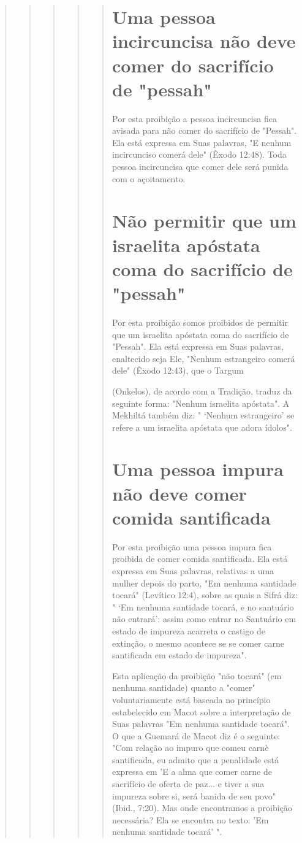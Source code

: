 \begin{quote}
\begin{quote}
\begin{quote}
\begin{quote}
\begin{quote}
\section{Uma pessoa incircuncisa não deve comer do sacrifício de "pessah"}

Por esta proibição a pessoa incircuncisa fica avisada para não comer do
sacrifício de "Pessah". Ela está expressa em Suas palavras, "E nenhum
incir­cunciso comerá dele" (Êxodo 12:48). Toda pessoa incircuncisa que
comer de­le será punida com o açoitamento.

\section{Não permitir que um israelita apóstata coma do sacrifício de "pessah"}

Por esta proibição somos proibidos de permitir que um israelita
após­tata coma do sacrifício de "Pessah". Ela está expressa em Suas
palavras, enalte­cido seja Ele, "Nenhum estrangeiro comerá dele" (Êxodo
12:43), que o Targum

(Onkelos), de acordo com a Tradição, traduz da seguinte forma: "Nenhum
is­raelita apóstata". A Mekhiltá também diz: " `Nenhum estrangeiro' se
refere a um israelita apóstata que adora ídolos".

\section{Uma pessoa impura não deve comer comida santificada}

Por esta proibição uma pessoa impura fica proibida de comer co­mida
santificada. Ela está expressa em Suas palavras, relativas a uma mulher
depois do parto, "Em nenhuma santidade tocará" (Levítico 12:4), sobre as
quais a Sifrá diz: " `Em nenhuma santidade tocará, e no santuário não
entrará': assim como entrar no Santuário em estado de impureza acarreta
o castigo de extinção, o mesmo acontece se se comer carne santificada em
estado de impureza".

Esta aplicação da proibição "não tocará" (em nenhuma santidade) quanto a
"comer" voluntariamente está baseada no princípio estabelecido em Macot
sobre a interpretação de Suas palavras "Em nenhuma santidade tocará". O
que a Guemará de Macot diz é o seguinte: "Com relação ao impuro que
co­meu carnè santificada, eu admito que a penalidade está expressa em 'E
a alma que comer carne de sacrifício de oferta de paz... e tiver a sua
impureza sobre si, será banida de seu povo" (Ibid., 7:20). Mas onde
encontramos a proibição necessária? Ela se encontra no texto: 'Em
nenhuma santidade tocará' ".


\end{quote}
\end{quote}
\end{quote}
\end{quote}
\end{quote}
